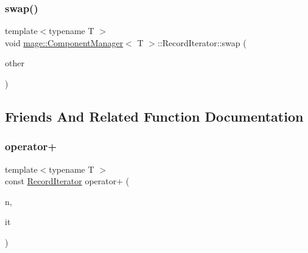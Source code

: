 \mbox{\label{classmage_1_1_component_manager_1_1_record_iterator_afa0ecd310d2d665a8988f28dac3f2025}} 
\subsubsection{\texorpdfstring{swap()}{swap()}}
{\footnotesize\ttfamily template$<$typename T $>$ \\
void \mbox{\hyperlink{classmage_1_1_component_manager}{mage\+::\+Component\+Manager}}$<$ T $>$\+::Record\+Iterator\+::swap (\begin{DoxyParamCaption}\item[{\mbox{\hyperlink{classmage_1_1_component_manager_1_1_record_iterator}{Record\+Iterator}} \&}]{other }\end{DoxyParamCaption})\hspace{0.3cm}{\ttfamily [noexcept]}}



\subsection{Friends And Related Function Documentation}
\mbox{\label{classmage_1_1_component_manager_1_1_record_iterator_ae69b32a2e0593d39292b95dbdc5ab8f1}} 
\subsubsection{\texorpdfstring{operator+}{operator+}}
{\footnotesize\ttfamily template$<$typename T $>$ \\
const \mbox{\hyperlink{classmage_1_1_component_manager_1_1_record_iterator}{Record\+Iterator}} operator+ (\begin{DoxyParamCaption}\item[{\mbox{\hyperlink{classmage_1_1_component_manager_1_1_record_iterator_a3ca7b08fca57e3f69c5de58be46edd70}{difference\+\_\+type}}}]{n,  }\item[{const \mbox{\hyperlink{classmage_1_1_component_manager_1_1_record_iterator}{Record\+Iterator}} \&}]{it }\end{DoxyParamCaption})\hspace{0.3cm}{\ttfamily [friend]}}

